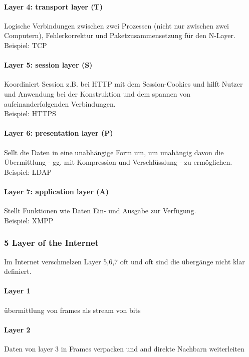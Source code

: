 				\paragraph{Layer 4: transport layer (T)}
					Logische Verbindungen zwischen zwei Prozessen (nicht nur zwischen zwei Computern), Fehlerkorrektur und Paketzusammensetzung für den N-Layer. \\
					Beispiel: TCP
				
				\paragraph{Layer 5: session layer (S)}
					Koordiniert Session z.B. bei HTTP mit dem Session-Cookies und hilft Nutzer und Anwendung bei der Konstruktion und dem spannen von aufeinanderfolgenden Verbindungen. \\
					Beispiel: HTTPS
				
				\paragraph{Layer 6: presentation layer (P)}
					Sellt die Daten in eine unabhängige Form um, um unahängig davon die Übermittlung - gg. mit Kompression und Verschlüsslung - zu ermöglichen. \\
					Beispiel: LDAP
				
				\paragraph{Layer 7: application layer (A)}
					Stellt Funktionen wie Daten Ein- und Ausgabe zur Verfügung. \\
					Beispiel: XMPP
		\subsubsection{5 Layer of the Internet}
			Im Internet verschmelzen Layer 5,6,7 oft und oft sind die übergänge nicht klar definiert. 
			\paragraph{Layer 1}
			   übermittlung von frames als stream von bits
			
			\paragraph{Layer 2}
				Daten von layer 3 in Frames verpacken und and direkte Nachbarn weiterleiten
			
